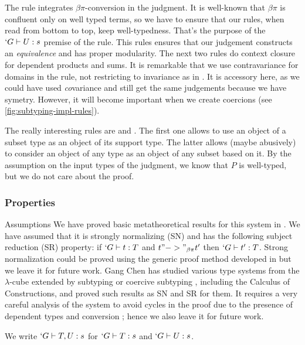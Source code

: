 \documentclass[twocolumn]{article}
\begin{document}
The rule  integrates $\beta\pi$-conversion in the
judgment. It is well-known \cite{Luo, Pottinger?} that $\beta\pi$ is
confluent only on well typed terms, so we have to ensure that our rules,
when read from bottom to top, keep well-typedness. That's the purpose of
the $`G \vdash U : s$ premise of the  rule. This rules
ensures that our judgement constructs an \emph{equivalence} and has
proper modularity. The next two rules do context closure for dependent
products and sums. It is remarkable that we use contravariance for
domains in the  rule, not restricting to invariance as in
\PVS \cite{journals/toplas/Castagna95}. It is accessory here, as we could have used \emph{co}variance and
still get the same judgements because we have symetry. However, it will
become important when we create coercions (see
\vref{fig:subtyping-impl-rules}).

The really interesting rules are  and
. The first one allows to use an object of a subset type
as an object of its support type. The latter allows (maybe abusively) to
consider an object of any type as an object of any subset based on
it. By the assumption on the input types of the judgment, we know that $P$
is well-typed, but we do not care about the proof.

\subsubsection{Properties}
\begin{paragraph}{Assumptions}
  We have proved basic metatheoretical results for this system in \Coq{}
  \cite{CCP}. We have assumed that it is strongly normalizing (SN) and has the
  following subject reduction (SR) property: if $`G \vdash t : T$ and $t
  "->"_{\beta\pi} t'$ then $`G \vdash t' : T$. Strong normalization
  could be proved using the generic proof method developed in
  \cite{Geuvers} but we leave it for future work. Gang Chen
  \cite{GangChen} has studied various type systems from the
  $\lambda$-cube extended by subtyping or coercive subtyping \cite{Luo},
  including the Calculus of Constructions, and proved such results as
  SN and SR for them. It requires a very careful analysis of the system 
  to avoid cycles in the proof due to the presence of dependent types and
  conversion ; hence we also leave it for future work.
\end{paragraph}

We write $`G \vdash T, U : s$ for $`G \vdash T : s$ and $`G \vdash U :
s$.
\end{document}
